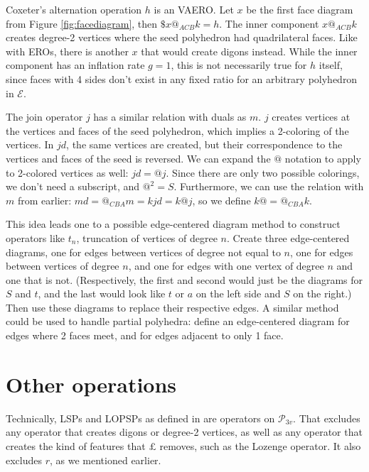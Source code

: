 \documentclass{amsart}[12pt]
\begin{document}
Coxeter's alternation operation $h$ is an VAERO. Let $x$ be the first face
diagram from Figure \ref{fig:facediagram}, then $\$x@_{ACB}k = h$. The inner
component $x@_{ACB}k$ creates degree-2 vertices where the seed polyhedron had
quadrilateral faces. Like with EROs, there is another $x$ that would create
digons instead. While the inner component has an inflation rate $g=1$,
this is not necessarily true for $h$ itself, since faces with 4 sides don't
exist in any fixed ratio for an arbitrary polyhedron in $\mathcal{E}$.

The join operator $j$ has a similar relation with duals as $m$. $j$ creates
vertices at the vertices and faces of the seed polyhedron, which implies a
2-coloring of the vertices. In $jd$, the same vertices are created, but their
correspondence to the vertices and faces of the seed is reversed. We can expand
the $@$ notation to apply to 2-colored vertices as well: $jd = @j$. Since there
are only two possible colorings, we don't need a subscript, and $@^2 = S$.
Furthermore, we can use the relation with $m$ from earlier: $md = @_{CBA}m =
kjd = k@j$, so we define $k@ = @_{CBA}k$.

This idea leads one to a possible edge-centered diagram method to construct
operators like $t_n$, truncation of vertices of degree $n$. Create three
edge-centered diagrams, one for edges between vertices of degree not equal to
$n$, one for edges between vertices of degree $n$, and one for edges with one
vertex of degree $n$ and one that is not. (Respectively, the first and second
would just be the diagrams for $S$ and $t$, and the last would look like $t$ or
$a$ on the left side and $S$ on the right.) Then use these diagrams to replace
their respective edges. A similar method could be used to handle partial
polyhedra: define an edge-centered diagram for edges where 2 faces meet, and
for edges adjacent to only 1 face.

\section{Other operations}

Technically, LSPs and LOPSPs as defined in \cite{brinkmann} are operators on
$\mathcal{P}_{3v}$. That excludes any operator that creates digons or degree-2
vertices, as well as any operator that creates the kind of features that
$\pounds$ removes, such as the Lozenge operator. It also excludes $r$,
as we mentioned earlier.
\end{document}
